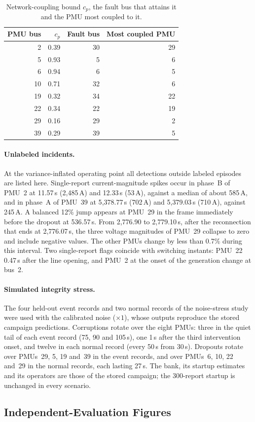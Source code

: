 \begin{table}[!t]\centering\small
\caption{Network-coupling bound $c_p$, the fault bus that attains it and
the PMU most coupled to it.}
\label{tab:supp-coupling}
\begin{tabular}{@{}rrrr@{}}\toprule
PMU bus & $c_p$ & Fault bus & Most coupled PMU\\\midrule
2 & 0.39 & 30 & 29\\
5 & 0.93 & 5 & 6\\
6 & 0.94 & 6 & 5\\
10 & 0.71 & 32 & 6\\
19 & 0.32 & 34 & 22\\
22 & 0.34 & 22 & 19\\
29 & 0.16 & 29 & 2\\
39 & 0.29 & 39 & 5\\\bottomrule
\end{tabular}\end{table}

\paragraph{Unlabeled incidents.} At the variance-inflated operating point
all detections outside labeled episodes are listed here. Single-report
current-magnitude spikes occur in phase~B of PMU~2 at 11.57\,s (2{,}485\,A)
and 12.33\,s (53\,A), against a median of about 585\,A, and in phase~A of
PMU~39 at 5{,}378.77\,s (702\,A) and 5{,}379.03\,s (710\,A), against 245\,A.
A balanced 12\% jump appears at PMU~29 in the frame immediately before
the dropout at 536.57\,s. From 2{,}776.90 to 2{,}779.10\,s, after the
reconnection that ends at 2{,}776.07\,s, the three voltage magnitudes of
PMU~29 collapse to zero and include negative values. The other PMUs change
by less than 0.7\% during this interval. Two single-report flags coincide with
switching instants: PMU~22 0.47\,s after the line opening, and PMU~2 at
the onset of the generation change at bus~2.

\paragraph{Simulated integrity stress.} The four held-out event records
and two normal records of the noise-stress study were used with the
calibrated noise ($\times1$), whose outputs reproduce the stored campaign
predictions. Corruptions rotate over the eight PMUs: three in the quiet
tail of each event record (75, 90 and 105\,s), one 1\,s after the third
intervention onset, and twelve in each normal record (every 50\,s from
30\,s). Dropouts rotate over PMUs~29, 5, 19 and~39 in the event records,
and over PMUs~6, 10, 22 and~29 in the normal records, each lasting 27\,s.
The bank, its startup estimates and its operators are those of the stored
campaign; the 300-report startup is unchanged in every scenario.

\FloatBarrier
\subsection{Independent-Evaluation Figures}

